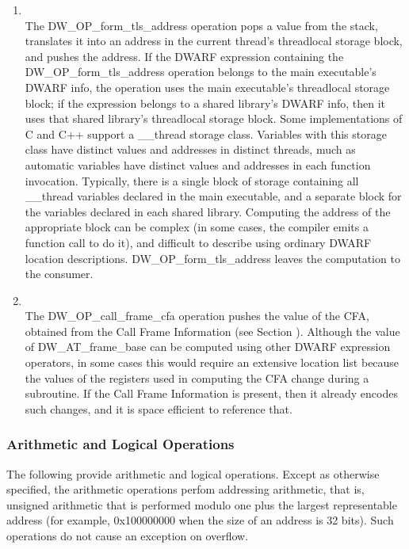 \begin{enumerate}[1]
\item {} \\
The DW\-\_OP\-\_form\-\_tls\-\_address operation pops a value from the
stack, translates it into an address in the current thread's
thread\dash local storage block, and pushes the address. If the
DWARF expression containing the DW\-\_OP\-\_form\-\_tls\-\_address
operation belongs to the main executable's DWARF info, the
operation uses the main executable's thread\dash local storage
block; if the expression belongs to a shared library's
DWARF info, then it uses that shared library's thread\dash local
storage block.  Some implementations of C and C++ support a
\_\_thread storage class. Variables with this storage class
have distinct values and addresses in distinct threads, much
as automatic variables have distinct values and addresses in
each function invocation. Typically, there is a single block
of storage containing all \_\_thread variables declared in
the main executable, and a separate block for the variables
declared in each shared library. Computing the address of
the appropriate block can be complex (in some cases, the
compiler emits a function call to do it), and difficult
to describe using ordinary DWARF location descriptions.
DW\-\_OP\-\_form\-\_tls\-\_address leaves the computation to the
consumer.

\item {} \\
The DW\-\_OP\-\_call\-\_frame\-\_cfa operation pushes the value of the
CFA, obtained from the Call Frame Information 
(see Section ).
Although the value of DW\-\_AT\-\_frame\-\_base
can be computed using other DWARF expression operators,
in some cases this would require an extensive location list
because the values of the registers used in computing the
CFA change during a subroutine. If the 
Call Frame Information 
is present, then it already encodes such changes, and it is
space efficient to reference that.
\end{enumerate}

\subsubsection{Arithmetic and Logical Operations}
The following provide arithmetic and logical operations. Except
as otherwise specified, the arithmetic operations perfom
addressing arithmetic, that is, unsigned arithmetic that is
performed modulo one plus the largest representable address
(for example, 0x100000000 when the size of an address is 32
bits). Such operations do not cause an exception on overflow.

